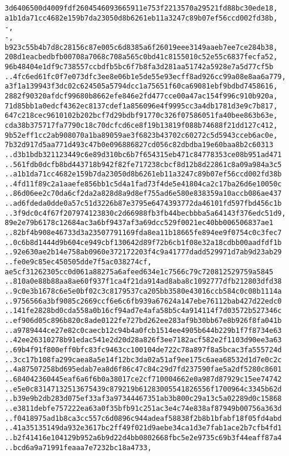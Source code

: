 \documentclass[
]{article}
\begin{document}
\begin{verbatim}
3d6406500d4009fdf2604546093665911e753f2213570a29521fd88bc30ede18,
a1b1da71cc4682e159b7da23050d8b6261eb11a3247c89b07ef56ccd002fd38b,
-,
-,
b923c55b4b7d8c28156c87e005c6d8385a6f26019eee3149aaeb7ee7ce284b38,
208d1eacbedbfb00708a7068c708a565c0bd41c8155010c52e55c6837fecfa52,
96b48404e1df9c738557ccbdfb5bc6f7b8fa3d281aa51742a5928e7a5d77cf5b
..4fc6ed61fc0f7e073dfc3ee8e06b1e5de55e93ecff8ad926cc99a08e8aa6a779,
a3f1a139943f3dc02c624505a5794dcc1a75651f60ca69081ebf9bdbd7458616,
2882f90320afdcf99680b8662efe846e2fd477cce00a47ac154f996c910b920a,
71d85bb1a0edcf4362ec8137cdef1a856096e4f9995cc3a4db1781d3e9c7b817,
647c218cec9610102b202bcf7d29bdbf91770c326f07586051fa40bee863b63e,
cda38b375717fa7790c18c70dcfcd6ce8f19b13819f088b74688f21dd127c412,
9b52eff1cc2ab908070a1ba89059ae3f6823b43702c60272c5d5943cceb6ac0e,
7b32d917d5aa771d493c47b0e096886827cd056c82dbdba19e60baa8b2c60313
..d3b1bdb321123449c6e89d310bc6b7f654315eb471c84778353ce08b951ad471
..561fdb0dcfb8bd443718b942f82fe717238cbcf8d12b8d22861c8a09a984a3c5
..a1b1da71cc4682e159b7da23050d8b6261eb11a3247c89b07ef56ccd002fd38b
..4fd11f89c2a1aaefe856bb1c5d4a1fad73f4de5e41804ca2c17ba26d6e10050c
..86d06ee2c70da6cf2da2a828d8a9d8ef755ad6e580e838359a10accb086ae437
..ad6fdeda0dde0a57c51d3226b87e3795e6474393772da46101fd597fbd456c1b
..3f9dc0c4f67f207974123830c2d66988fb3fb44becbbba5a64143f376edc51d9,
89e2e79b6178c12684ac3a6bf9437af3a69dcc529f0021ec40bb006506837ae1
..82bf4b908e46733d3a23507791169fda8ea11b18665fe894ee9f0754c0c3fec7
..0c6b8d1444d9b604ce949cbf130642d89f72b6cb1f08e32a18cdbb00aadfdf1b
..92e630ae2b14e758ab0960e372172203f4c9a41777dadd529971d7ab9d23ab29
..fe0e9c85ec450505dde7f5ac038274cf,
ae5cf31262305cc0d061a88275a6afeed634e1c7566c79c720812529759a5845
..810a0e88b88aa8ae60f937f1ca4f21da914ad8aba8c1092777dfb212803dfd38
..9c0e3b1678c6e5e0bf02c3c8179537ca205bb3580e43016ccb584c0c08b1114a
..9756566a3bf9085c2669ccf6e6c6fb939a67624a147ebe76112bab427d22edc0
..141fe2828bd0cda558a0b16cf94ad7e4afa58b5c4a914114f7d03572b527346c
..ef906d05c896b820c8ade0122fe727bd262ee283af9b30bb67e8b926f8fa041b
..a9789444ce27e82c0caecb12c94b4a0fcb1514ee4905b644b229b1f7f8734e63
..42ee26310278b91edac541e2d20d28a826f3ee7182acf582e2f1103d90ee3a63
..69b4f91f800eff0bfc83fc9463cc100104de722c78a897f8a5bcac3fa555724d
..3cc17b108fa299caea8a5e14f12bc3da02a51af9ee175c6aea68532d1d7e0c2c
..4a87507258bd695edab7ea8d6f86c47c84c29d7fd237590fae5a2df5280c8601
..684042360445eaf6a6f6b0a38017ce2cf710004662e0a987d87929c15ee74742
..e5e0c83147132513675439c879219b61283005541826556f1700964c3345b62d
..b39e9b2db283d075ef33af3a97344467351ab3b800c29a13c5a02289d0c15868
..e3811debfe757222ea63a0f35bfb91c251ac3e4c74e838af87949b00756a363d
..f0418975ad1b8ca3cc557c6d0896c944adeaf58838f2b8b1bfabf18f05fd4abd
..41a35135149da932e3617bc2ff49f021d9aebe34ca1d3e7fab1ace2b7cfb4fd1
..b2f41416e104129b952a6b9d22d4bb0802668fbc5e2e9735c69b3f44eaff87a4
..bcd6a9a71991feaaa7e7232bc18a4733,
\end{verbatim}
\end{document}
